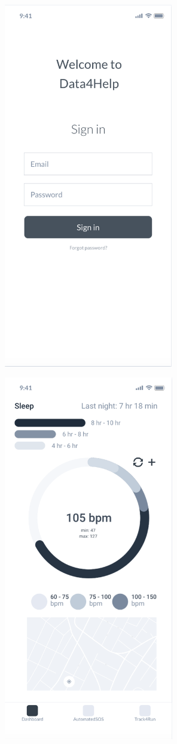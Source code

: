 \documentclass{article}
\begin{document}
	\begin{figure}[!h]
	 	\centering
		\includegraphics[height=16cm,keepaspectratio]{Figures/2SignIn}
	\end{figure}\newpage
	
	\begin{figure}[!h]
	 	\centering
		\includegraphics[height=16cm,keepaspectratio]{Figures/3Dashboard}
	\end{figure}\newpage
	
\end{document}
